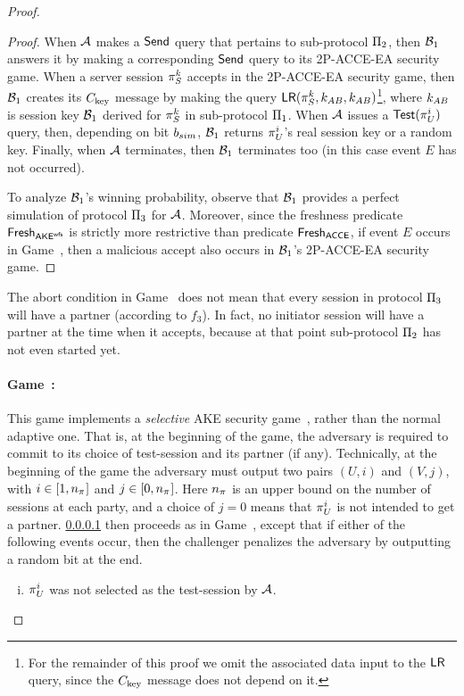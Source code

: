 \begin{proof}
\begin{proof}
When $\A$ makes a $\Send$ query that pertains to sub-protocol $\protocol_2$,
then $\A[B]_1$ answers it by making a corresponding $\Send$ query to its 2P-ACCE-EA security game.
When a server session $\oracle[S][k]$ accepts in the 2P-ACCE-EA security game,
then $\A[B]_1$ creates its $\Ckey$ message by making the query $\Encrypt(\oracle[S][k], \key_{AB}, \key_{AB})$\footnote{For
the remainder of this proof we omit the associated data input to the $\Encrypt$ query,
since the $\Ckey$ message does not depend on it.
},
where $\key_{AB}$ is session key $\A[B]_1$ derived for $\oracle[S][k]$ in sub-protocol $\protocol_1$.
When $\A$ issues a $\Test(\oracle[U][i])$ query,
then,
depending on bit $\bsim$, $\A[B]_1$ returns $\oracle[U][i]$'s  real session key or a random key.
Finally,
when $\A$ terminates,
then $\A[B]_1$ terminates too
(in this case event $E$ has not occurred).

To analyze $\A[B]_1$'s winning probability,
observe that $\A[B]_1$ provides a perfect simulation of protocol $\protocol_3$ for $\A$.
Moreover,
since the freshness predicate $\fresh_{\akewfs}$ is strictly more restrictive than predicate $\fresh_{\acce}$,
if event $E$ occurs in Game~\prevgame,
then a malicious accept also occurs in $\A[B]_1$'s 2P-ACCE-EA security game.
\end{proof}




\begin{remark}
The abort condition in Game~\game{} does not mean that every session in protocol \emph{$\protocol_3$} will have a partner (according to $f_3$).
In fact, 
no initiator session will have a partner at the time when it accepts, 
because at that point sub-protocol $\protocol_2$ has not even started yet.
\end{remark}






\newgame
\paragraph{Game~\game:}\label{game_hop:3P-KD:guess_test-session}
This game implements a \emph{selective} AKE security game~\cite[§3.3]{EPRINT:KraPatWee13},
rather than the normal adaptive one.
That is,
at the beginning of the game, 
the adversary is required to commit to its choice of test-session and its partner (if any).
Technically, 
at the beginning of the game the adversary must output two pairs $(U,i)$ and $(V,j)$,
with $i \in [1,\numsessions]$ and $j \in [0, \numsessions]$.
Here $\numsessions$ is an upper bound on the number of sessions at each party,
and a choice of $j = 0$ means that $\oracle[U][i]$ is not intended to get a partner.
\cref{game_hop:3P-KD:guess_test-session} then proceeds as in Game~\prevgame{},
except that if either of the following events occur,
then the challenger penalizes the adversary by outputting a random bit at the end.
\begin{enumerate}[(i)]
	\item $\oracle[U][i]$ was not selected as the test-session by $\A$.
	

\end{enumerate}
\end{proof}
